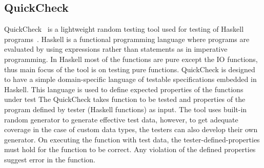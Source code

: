 \subsection{QuickCheck}
QuickCheck~\cite{Claessen2000} is a lightweight random testing tool used for testing of Haskell programs~\cite{Hudak2007}. Haskell is a functional programming language where programs are evaluated by using expressions rather than statements as in imperative programming. In Haskell most of the functions are pure except the IO functions, thus main focus of the tool is on testing pure functions. QuickCheck is designed to have a simple domain-specific language of testable specifications embedded in Haskell. This language is used to define expected properties of the functions under test %
\indent The QuickCheck takes function to be tested and properties of the program defined by tester (Haskell functions) as input. The tool uses built-in random generator to generate effective test data, however, to get adequate coverage in the case of custom data types, the testers can also develop their own generator. On executing the function with test data, the tester-defined-properties must hold for the function to be correct. Any violation of the defined properties suggest error in the function.







